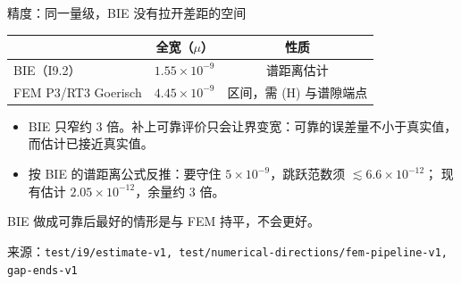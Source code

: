 \documentclass[aspectratio=169,11pt,fontset=fandol]{ctexbeamer}
\newcommand{\key}[1]{\begin{keybox}#1\end{keybox}}
\newcommand{\src}[1]{{\scriptsize\color{muted}来源：\texttt{#1}}}
\begin{document}
\begin{frame}{精度：同一量级，BIE 没有拉开差距的空间}
  \centering
  \begin{tabular}{lcc}
    \toprule
    & 全宽（$\mu$） & 性质 \\
    \midrule
    BIE（I9.2） & $1.55\times10^{-9}$ & 谱距离估计 \\
    FEM P3/RT3 Goerisch & $4.45\times10^{-9}$ & 区间，需 (H) 与谱隙端点 \\
    \bottomrule
  \end{tabular}
  \vspace{0.8em}
  \raggedright
  \begin{itemize}
    \item BIE 只窄约 3 倍。补上可靠评价只会让界\alert{变宽}：可靠的误差量不小于真实值，而估计已接近真实值。
    \item 按 BIE 的谱距离公式反推：要守住 $5\times10^{-9}$，跳跃范数须 $\lesssim 6.6\times10^{-12}$；
      现有估计 $2.05\times10^{-12}$，余量约 \alert{3 倍}。
  \end{itemize}
  \key{BIE 做成可靠后最好的情形是与 FEM 持平，不会更好。}
  \src{test/i9/estimate-v1, test/numerical-directions/fem-pipeline-v1, gap-ends-v1}
\end{frame}
\end{document}
